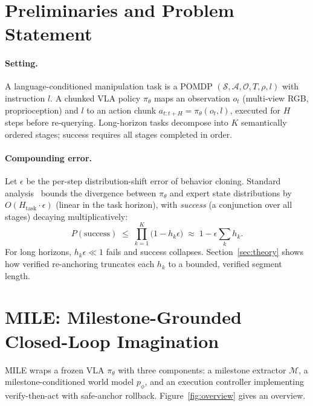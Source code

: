 \documentclass{article}
\newcommand{\mile}{\textsc{MILE}}
\begin{document}
\section{Preliminaries and Problem Statement}
\label{sec:prelim}

\paragraph{Setting.}
A language-conditioned manipulation task is a POMDP $(\mathcal{S}, \mathcal{A}, \mathcal{O}, T, \rho, l)$ with instruction $l$. A chunked VLA policy $\pi_\theta$ maps an observation $o_t$ (multi-view RGB, proprioception) and $l$ to an action chunk $a_{t:t+H} = \pi_\theta(o_t, l)$, executed for $H$ steps before re-querying. Long-horizon tasks decompose into $K$ semantically ordered stages; success requires all stages completed in order.

\paragraph{Compounding error.}
Let $\epsilon$ be the per-step distribution-shift error of behavior cloning. Standard analysis~\cite{ross2011} bounds the divergence between $\pi_\theta$ and expert state distributions by $O(H_{\mathrm{task}} \cdot \epsilon)$ (linear in the task horizon), with \emph{success} (a conjunction over all stages) decaying multiplicatively:
\begin{equation}
P(\mathrm{success}) \;\le\; \prod_{k=1}^{K}\big(1 - h_k \epsilon\big) \;\approx\; 1 - \epsilon \textstyle\sum_k h_k .
\label{eq:compounding}
\end{equation}
For long horizons, $h_k \epsilon \ll 1$ fails and success collapses. Section~\ref{sec:theory} shows how verified re-anchoring truncates each $h_k$ to a bounded, verified segment length.

\section{\mile{}: Milestone-Grounded Closed-Loop Imagination}
\label{sec:method}

\mile{} wraps a frozen VLA $\pi_\theta$ with three components: a milestone extractor $\mathcal{M}$, a milestone-conditioned world model $p_\phi$, and an execution controller implementing verify-then-act with safe-anchor rollback. Figure~\ref{fig:overview} gives an overview.
\end{document}
